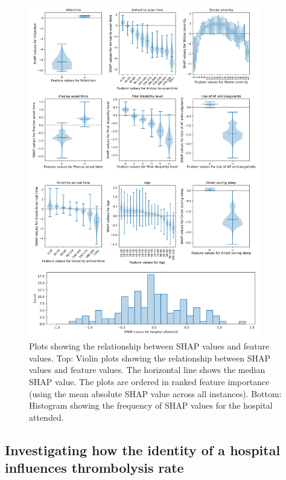 \begin{figure}%
\centering
\includegraphics[width=0.9\textwidth]{./images/03a_combined_shap}
\caption{Plots showing the relationship between SHAP values and feature values. Top: Violin plots showing the relationship between SHAP values and feature values. The horizontal line shows the median SHAP value. The plots are ordered in ranked feature importance (using the mean absolute SHAP value across all instances). Bottom: Histogram showing the frequency of SHAP values for the hospital attended.}
\label{fig:shap_feature_subfigure}
\end{figure}


\subsection{Investigating how the identity of a hospital influences thrombolysis rate}

